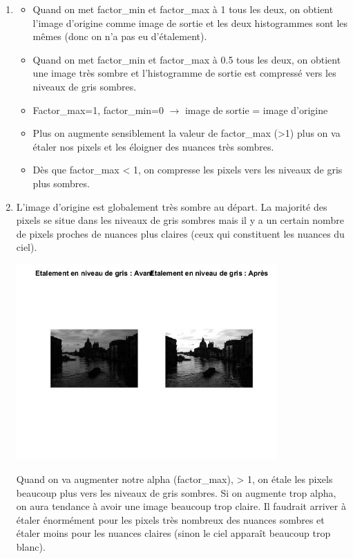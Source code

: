 \documentclass{article}
\begin{document}
\begin{enumerate}[label=\arabic*$\degres$)]
	\item 
	\begin{itemize}\renewcommand{\labelitemi}{$\bullet$}
		\item Quand on met factor\_min et factor\_max à 1 tous les deux, on obtient l’image d’origine comme image de sortie et les deux histogrammes sont les mêmes (donc on n’a pas eu d’étalement).
		\item Quand on met factor\_min et factor\_max à 0.5 tous les deux, on obtient une image très sombre et l’histogramme de sortie est compressé vers les niveaux de gris sombres.
		\item Factor\_max=1, factor\_min=0 $\rightarrow$ image de sortie = image d’origine
		\item Plus on augmente sensiblement la valeur de factor\_max (>1) plus on va étaler nos pixels et les éloigner des nuances très sombres.
		\item Dès que factor\_max < 1, on compresse les pixels vers les niveaux de gris plus sombres.
	\end{itemize}
	\item L'image d’origine est globalement très sombre au départ. La majorité des pixels se situe dans les niveaux de gris sombres mais il y a un certain nombre de pixels proches de nuances plus claires (ceux qui constituent les nuances du ciel).

\includegraphics[width=10cm]{Venise_etalement.jpg}

Quand on va augmenter notre alpha (factor\_max), > 1, on étale les pixels beaucoup plus vers les niveaux de gris sombres.
Si on augmente trop alpha, on aura tendance à avoir une image beaucoup trop claire. Il faudrait arriver à étaler énormément pour les pixels très nombreux des nuances sombres et étaler moins pour les nuances claires (sinon le ciel apparaît beaucoup trop blanc).
\end{enumerate}
\end{document}
